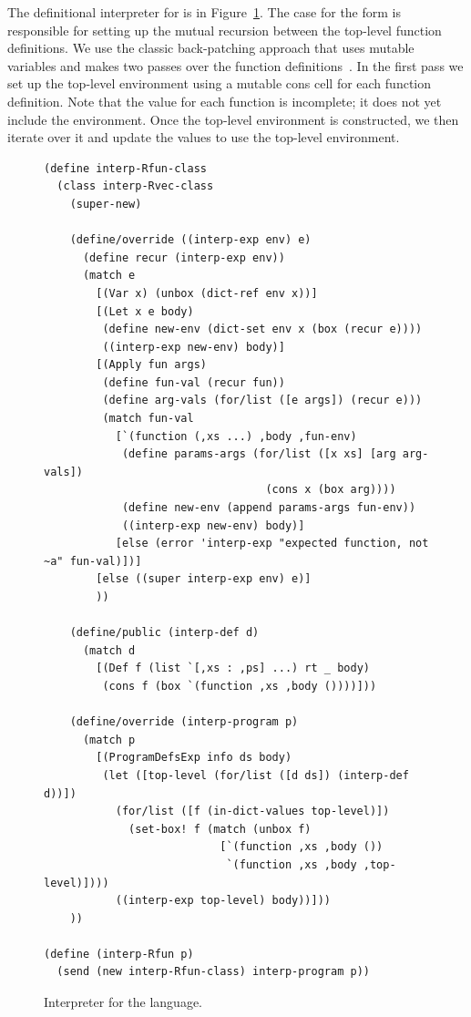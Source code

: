 \documentclass[11pt]{book}
\newcommand{\ocaml}[1]{{\color{blue}{#1}}}
\begin{document}
The definitional interpreter for \LangFun{} is in
Figure~\ref{fig:interp-Rfun}. \ocaml{(The OCaml version is in file \code{RFun.ml}.)}
The case for the  form is
responsible for setting up the mutual recursion between the top-level
function definitions. We use the classic back-patching 
approach that uses mutable variables and makes two passes over the function
definitions~\citep{Kelsey:1998di}.  In the first pass we set up the
top-level environment using a mutable cons cell for each function
definition. Note that the  value for each function is
incomplete; it does not yet include the environment.  Once the
top-level environment is constructed, we then iterate over it and
update the  values to use the top-level environment.
\ocaml{This complication is really not needed. In the OCaml version,
  we do not associate environments with function values, but instead
  use a single separate environment of (top-level) functions that is passed
  down to the recursive evaluator, together with the usual environment for
  local variables (which also holds function parameters).}

\begin{figure}[tp]
\begin{lstlisting}
(define interp-Rfun-class
  (class interp-Rvec-class
    (super-new)

    (define/override ((interp-exp env) e)
      (define recur (interp-exp env))
      (match e
        [(Var x) (unbox (dict-ref env x))]
        [(Let x e body)
         (define new-env (dict-set env x (box (recur e))))
         ((interp-exp new-env) body)]
        [(Apply fun args)
         (define fun-val (recur fun))
         (define arg-vals (for/list ([e args]) (recur e)))
         (match fun-val
           [`(function (,xs ...) ,body ,fun-env)
            (define params-args (for/list ([x xs] [arg arg-vals])
                                  (cons x (box arg))))
            (define new-env (append params-args fun-env))
            ((interp-exp new-env) body)]
           [else (error 'interp-exp "expected function, not ~a" fun-val)])]
        [else ((super interp-exp env) e)]
        ))

    (define/public (interp-def d)
      (match d
        [(Def f (list `[,xs : ,ps] ...) rt _ body)
         (cons f (box `(function ,xs ,body ())))]))

    (define/override (interp-program p)
      (match p
        [(ProgramDefsExp info ds body)
         (let ([top-level (for/list ([d ds]) (interp-def d))])
           (for/list ([f (in-dict-values top-level)])
             (set-box! f (match (unbox f)
                           [`(function ,xs ,body ())
                            `(function ,xs ,body ,top-level)])))
           ((interp-exp top-level) body))]))
    ))

(define (interp-Rfun p)
  (send (new interp-Rfun-class) interp-program p))
\end{lstlisting}
\caption{Interpreter for the \LangFun{} language.}
\label{fig:interp-Rfun}
\end{figure}
\end{document}
